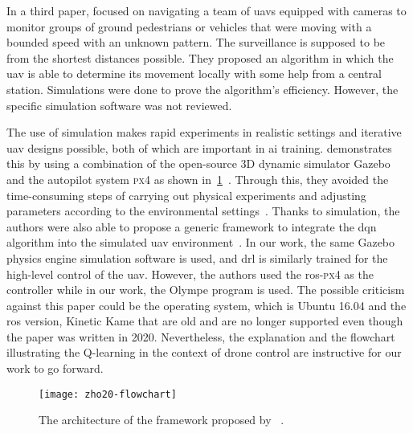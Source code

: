 \documentclass[../main.tex]{subfiles}
\begin{document}
In a third paper, \cite{hua21} focused on navigating a team
of \glspl{uav} equipped with cameras to monitor groups of ground 
pedestrians or vehicles that were moving with a bounded speed with an unknown pattern. 
The surveillance is supposed to be from the shortest distances possible. 
They proposed an algorithm in which the \gls{uav} is able to determine 
its movement locally with some help from a central station.
Simulations were done to prove the algorithm's efficiency. However, the 
specific simulation software was not reviewed. 


The use of simulation makes rapid experiments in realistic settings 
and iterative \gls{uav} designs possible, 
both of which are important in \gls{ai} training. 
\citeauthor{Zho20} demonstrates this by %
using a combination of the open-source 3D dynamic simulator Gazebo
and the autopilot system \textsc{px}4 
as shown in~\cref{fig:zho20}~\cite{Zho20}.
Through this, they avoided the time-consuming steps of 
carrying out physical experiments
and adjusting parameters according 
to the environmental settings~\cite{Zho20}.
Thanks to simulation, 
the authors were also able to propose a generic
framework to integrate the \gls{dqn} algorithm into 
the simulated \gls{uav} environment~\cite{Zho20}.
In our work, the same Gazebo physics engine
simulation software is used, and \gls{drl} is similarly trained
for the high-level control of the \gls{uav}. 
However, the authors used the \gls{ros}-\textsc{px}4 as the controller 
while in our work, the Olympe program is used.
The possible criticism against this paper could be the operating system,
which is Ubuntu 16.04 and 
the \gls{ros} version, Kinetic Kame that are old and are no longer supported 
even though the paper was written in 2020.
Nevertheless, the explanation and the flowchart illustrating the 
Q-learning in the context of drone control are instructive 
for our work to go forward.

\begin{figure}[b] 
    \centering
    \texttt{[image: zho20-flowchart]} 
    \caption[The architecture of the framework proposed by
    \citeauthor{Zho20}.]
    {The architecture of the framework proposed by
    \citeauthor{Zho20}~\cite[Fig.~2]{Zho20}.} 
    \label{fig:zho20} 
\end{figure}
\end{document}

